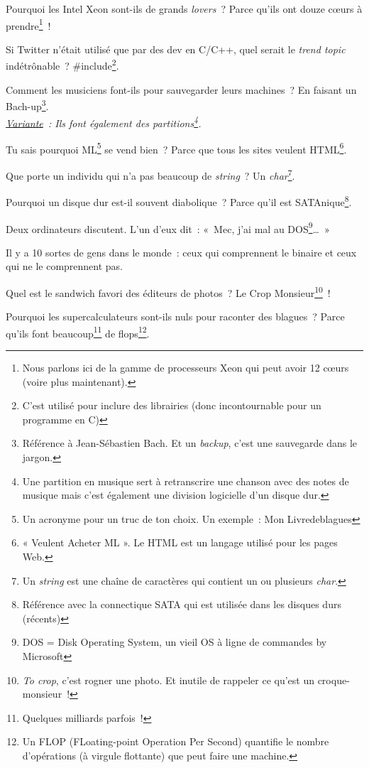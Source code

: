 \documentclass[10pt,a5paper,fullpage]{book}
\begin{document}
\begin{enumerate}
{		\item Pourquoi les Intel Xeon sont-ils de grands \textit{lovers}~? Parce qu'ils ont douze cœurs à prendre\footnote{Nous parlons ici de la gamme de processeurs Xeon qui peut avoir 12 cœurs (voire plus maintenant).}~!
		\item Si Twitter n'était utilisé que par des dev en C/C++, quel serait le \textit{trend topic} indétrônable~? \#include\footnote{C'est utilisé pour inclure des librairies (donc incontournable pour un programme en C)}.	
		\item Comment les musiciens font-ils pour sauvegarder leurs machines~? En faisant un Bach-up\footnote{Référence à Jean-Sébastien Bach. Et un \textit{backup}, c'est une sauvegarde dans le jargon.}.
		\\\textit{\underline{Variante}~: Ils font également des partitions\footnote{Une partition en musique sert à retranscrire une chanson avec des notes de musique mais c'est également une division logicielle d'un disque dur.}.} 
		\item Tu sais pourquoi ML\footnote{Un acronyme pour un truc de ton choix. Un exemple~: Mon Livredeblagues} se vend bien~? Parce que tous les sites veulent HTML\footnote{« Veulent Acheter ML ». Le HTML est un langage utilisé pour les pages Web.}.
		\item Que porte un individu qui n’a pas beaucoup de \textit{string}~? Un \textit{char}\footnote{Un \textit{string} est une chaîne de caractères qui contient un ou plusieurs \textit{char}.}.
		\item Pourquoi un disque dur est-il souvent diabolique~? Parce qu’il est SATAnique\footnote{Référence avec la connectique SATA qui est utilisée dans les disques durs (récents)}.
		\item Deux ordinateurs discutent. L’un d’eux dit~: « Mec, j’ai mal au DOS\footnote{DOS = Disk Operating System, un vieil OS à ligne de commandes by Microsoft}\ldots »
		\item Il y a 10 sortes de gens dans le monde~: ceux qui comprennent le binaire et ceux qui ne le comprennent pas.
		\item Quel est le sandwich favori des éditeurs de photos~? Le Crop Monsieur\footnote{\textit{To crop}, c'est rogner une photo. Et inutile de rappeler ce qu'est un croque-monsieur~!}~!
		\item Pourquoi les supercalculateurs sont-ils nuls pour raconter des blagues~? Parce qu’ils font beaucoup\footnote{Quelques milliards parfois~!} de flops\footnote{Un FLOP (FLoating-point Operation Per Second) quantifie le nombre d’opérations (à virgule flottante) que peut faire une machine.}. 
}
\end{enumerate}
\end{document}
